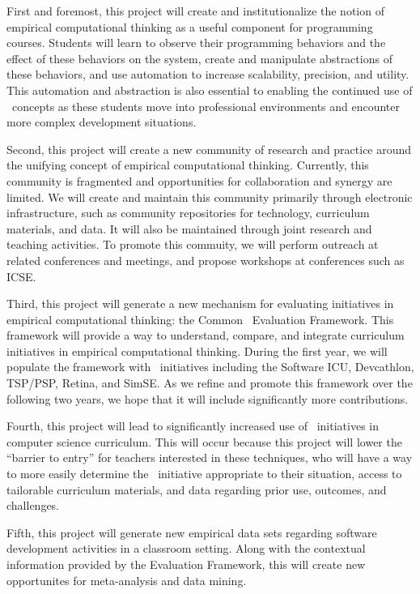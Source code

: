 First and foremost, this project will create and institutionalize the
notion of empirical computational thinking as a useful component for
programming courses.  Students will learn to observe their programming
behaviors and the effect of these behaviors on the system, create and
manipulate abstractions of these behaviors, and use automation to increase
scalability, precision, and utility.  This automation and abstraction is also
essential to enabling the continued use of \eCT\ concepts as these students
move into professional environments and encounter more complex development
situations.

Second, this project will create a new community of research and practice
around the unifying concept of empirical computational thinking.
Currently, this community is fragmented and opportunities for collaboration
and synergy are limited.  We will create and maintain this community
primarily through electronic infrastructure, such as community repositories
for technology, curriculum materials, and data.  It will also be maintained
through joint research and teaching activities.  To promote this commuity,
we will perform outreach at related conferences and meetings, and propose
workshops at conferences such as ICSE.

Third, this project will generate a new mechanism for evaluating initiatives
in empirical computational thinking: the Common \eCT\ Evaluation
Framework.  This framework will provide a way to understand, compare, and
integrate curriculum initiatives in empirical computational thinking.
During the first year, we will populate the framework with \eCT\
initiatives including the Software ICU, Devcathlon, TSP/PSP, Retina, and
SimSE.  As we refine and promote this framework over the following two
years, we hope that it will include significantly more contributions.

Fourth, this project will lead to significantly increased use of \eCT\
initiatives in computer science curriculum.  This will occur because this
project will lower the ``barrier to entry'' for teachers interested in
these techniques, who will have a way to more easily determine the \eCT\
initiative appropriate to their situation, access to tailorable curriculum
materials, and data regarding prior use, outcomes, and challenges.

Fifth, this project will generate new empirical data sets regarding
software development activities in a classroom setting.  Along with the
contextual information provided by the Evaluation Framework, this will
create new opportunites for meta-analysis and data mining.  

